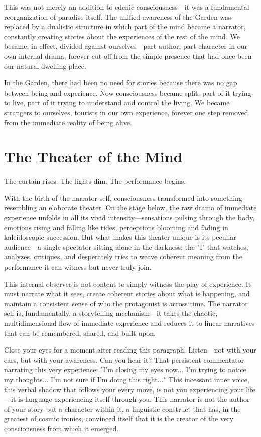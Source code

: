 This was not merely an addition to edenic consciousness—it was a fundamental reorganization of paradise itself. The unified awareness of the Garden was replaced by a dualistic structure in which part of the mind became a narrator, constantly creating stories about the experiences of the rest of the mind. We became, in effect, divided against ourselves—part author, part character in our own internal drama, forever cut off from the simple presence that had once been our natural dwelling place.

In the Garden, there had been no need for stories because there was no gap between being and experience. Now consciousness became split: part of it trying to live, part of it trying to understand and control the living. We became strangers to ourselves, tourists in our own experience, forever one step removed from the immediate reality of being alive.

\section{The Theater of the Mind}

The curtain rises. The lights dim. The performance begins.

With the birth of the narrator self, consciousness transformed into something resembling an elaborate theater. On the stage below, the raw drama of immediate experience unfolds in all its vivid intensity—sensations pulsing through the body, emotions rising and falling like tides, perceptions blooming and fading in kaleidoscopic succession. But what makes this theater unique is its peculiar audience—a single spectator sitting alone in the darkness: the "I" that watches, analyzes, critiques, and desperately tries to weave coherent meaning from the performance it can witness but never truly join.

This internal observer is not content to simply witness the play of experience. It must narrate what it sees, create coherent stories about what is happening, and maintain a consistent sense of who the protagonist is across time. The narrator self is, fundamentally, a storytelling mechanism—it takes the chaotic, multidimensional flow of immediate experience and reduces it to linear narratives that can be remembered, shared, and built upon.

Close your eyes for a moment after reading this paragraph. Listen—not with your ears, but with your awareness. Can you hear it? That persistent commentator narrating this very experience: "I'm closing my eyes now... I'm trying to notice my thoughts... I'm not sure if I'm doing this right..." This incessant inner voice, this verbal shadow that follows your every move, is not you experiencing your life—it is language experiencing itself through you. This narrator is not the author of your story but a character within it, a linguistic construct that has, in the greatest of cosmic ironies, convinced itself that it is the creator of the very consciousness from which it emerged.

